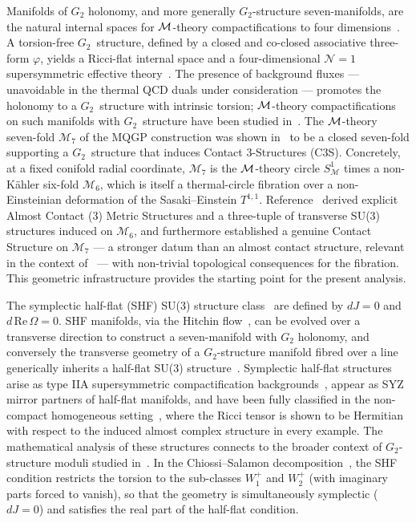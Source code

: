 \documentclass[a4paper,11pt,fleqn]{article}
\theoremstyle{plain}
\theoremstyle{definition}
\begin{document}
Manifolds of $G_2$ holonomy, and more generally $G_2$-structure seven-manifolds, are the
natural internal spaces for ${\cal M}$-theory compactifications to four dimensions~\cite{Acharya:2004qe,
Papadopoulos:1995da}. A torsion-free $G_2$~structure, defined by a closed and co-closed
associative three-form $\varphi$, yields a Ricci-flat internal space and a four-dimensional
$\mathcal{N}=1$ supersymmetric effective theory~\cite{Acharya:2004qe,Papadopoulos:1995da}.
The presence of background fluxes --- unavoidable in the thermal QCD duals under consideration
--- promotes the holonomy to a $G_2$~structure with intrinsic torsion; ${\cal M}$-theory
compactifications on such manifolds with $G_2$~structure have been studied
in~\cite{Lukas:2004ip,House:2004pm,Dall'Agata:2005ff}. The ${\cal M}$-theory seven-fold $\mathcal{M}_7$
of the MQGP construction was shown in~\cite{ACMS} to be a closed seven-fold supporting a
$G_2$~structure that induces Contact 3-Structures (C3S). Concretely, at a fixed conifold radial coordinate, $\mathcal{M}_7$ is the ${\cal M}$-theory circle $S^1_{\mathcal{M}}$ times a non-K\"{a}hler six-fold
$\mathcal{M}_6$, which is itself a thermal-circle fibration over a non-Einsteinian deformation
of the Sasaki--Einstein $T^{1,1}$. Reference~\cite{ACMS}
derived explicit Almost Contact (3) Metric Structures and a three-tuple of transverse SU(3)
structures induced on $\mathcal{M}_6$, and furthermore established a genuine Contact Structure
on $\mathcal{M}_7$ --- a stronger datum than an almost contact structure, relevant in the
context of~\cite{Arikan:2011zm,Arikan:2012gt,Todd:2015apo,Sasaki,Kuo-AC3S,3-Sasakian-geometry,
Friedrich:1997} --- with non-trivial topological consequences for the fibration. This geometric
infrastructure provides the starting point for the present analysis.

The symplectic half-flat (SHF) SU(3) structure class~\cite{Chiossi:2002,Conti:2006} are defined
by $dJ=0$ and $d\,\mathrm{Re}\,\Omega=0$. SHF manifolds, via the Hitchin flow~\cite{Hitchin:2001rw}, can be evolved over a transverse direction to
construct a seven-manifold with $G_2$ holonomy, and conversely the transverse geometry of a
$G_2$-structure manifold fibred over a line generically inherits a half-flat SU(3)
structure~\cite{Chiossi:2002}. Symplectic half-flat structures arise as type IIA supersymmetric
compactification backgrounds~\cite{Conti:2006}, appear as SYZ mirror partners of half-flat
manifolds, and have been fully classified in the non-compact homogeneous
setting~\cite{Podesta:2017}, where the Ricci tensor is shown to be Hermitian with respect to
the induced almost complex structure in every example. The mathematical analysis of these
structures connects to the broader context of $G_2$-structure moduli studied
in~\cite{Ossa et al[2013]}. In the Chiossi--Salamon decomposition~\cite{Chiossi:2002}, the SHF
condition restricts the torsion to the sub-classes $W_1^+$ and $W_2^+$ (with imaginary parts
forced to vanish), so that the geometry is simultaneously symplectic ($dJ=0$) and satisfies the
real part of the half-flat condition. 
\end{document}
